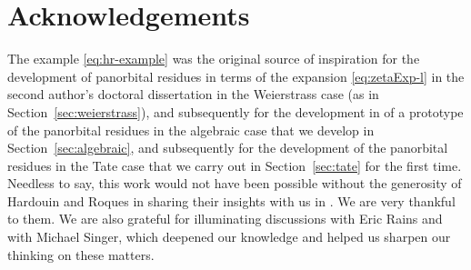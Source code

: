 \documentclass[preprint,12pt]{elsarticle}
\numberwithin{equation}{section} %
\theoremstyle{theorem}
\theoremstyle{definition}
\begin{document}
\section*{Acknowledgements}

The example \eqref{eq:hr-example} was the original source of inspiration for the development of panorbital residues in terms of the expansion \eqref{eq:zetaExp-l} in the second author's doctoral dissertation \cite{Babbitt2025} in the Weierstrass case (as in Section~\ref{sec:weierstrass}), and subsequently for the development in \cite{Babbitt2025} of a prototype of the panorbital residues in the algebraic case that we develop in Section~\ref{sec:algebraic}, and subsequently for the development of the panorbital residues in the Tate case that we carry out in Section~\ref{sec:tate} for the first time. Needless to say, this work would not have been possible without the generosity of Hardouin and Roques in sharing their insights with us in \cite{hardouin-roques:2023}. We are very thankful to them. We are also grateful for illuminating discussions with Eric Rains and with Michael Singer, which deepened our knowledge and helped us sharpen our thinking on these matters.
\end{document}
